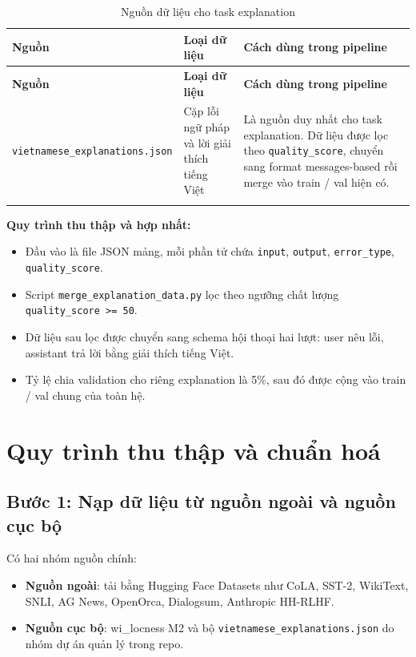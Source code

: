 \documentclass[12pt,a4paper]{article}
\begin{document}
\begin{longtable}{p{3.5cm}p{4cm}p{7cm}}
\toprule
\textbf{Nguồn} & \textbf{Loại dữ liệu} & \textbf{Cách dùng trong pipeline} \\
\midrule
\endfirsthead
\toprule
\textbf{Nguồn} & \textbf{Loại dữ liệu} & \textbf{Cách dùng trong pipeline} \\
\midrule
\endhead
\texttt{vietnamese\_explanations.json} & Cặp lỗi ngữ pháp và lời giải thích tiếng Việt & Là nguồn duy nhất cho task explanation. Dữ liệu được lọc theo \texttt{quality\_score}, chuyển sang format messages-based rồi merge vào train / val hiện có. \\
\bottomrule
\caption{Nguồn dữ liệu cho task explanation}
\end{longtable}

\textbf{Quy trình thu thập và hợp nhất:}
\begin{itemize}[leftmargin=1.2cm]
    \item Đầu vào là file JSON mảng, mỗi phần tử chứa \texttt{input}, \texttt{output}, \texttt{error\_type}, \texttt{quality\_score}.
    \item Script \texttt{merge\_explanation\_data.py} lọc theo ngưỡng chất lượng \texttt{quality\_score >= 50}.
    \item Dữ liệu sau lọc được chuyển sang schema hội thoại hai lượt: user nêu lỗi, assistant trả lời bằng giải thích tiếng Việt.
    \item Tỷ lệ chia validation cho riêng explanation là 5\%, sau đó được cộng vào train / val chung của toàn hệ.
\end{itemize}

\section{Quy trình thu thập và chuẩn hoá}

\subsection{Bước 1: Nạp dữ liệu từ nguồn ngoài và nguồn cục bộ}

Có hai nhóm nguồn chính:

\begin{itemize}[leftmargin=1.2cm]
    \item \textbf{Nguồn ngoài}: tải bằng Hugging Face Datasets như CoLA, SST-2, WikiText, SNLI, AG News, OpenOrca, Dialogsum, Anthropic HH-RLHF.
    \item \textbf{Nguồn cục bộ}: wi\_locness M2 và bộ \texttt{vietnamese\_explanations.json} do nhóm dự án quản lý trong repo.
\end{itemize}
\end{document}
